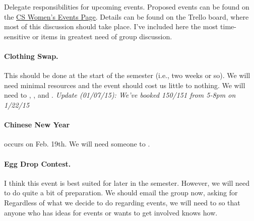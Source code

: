 \documentclass{agenda}
\begin{document}
\begin{agendaitem}{15}{Delegate responsibilities for upcoming events.}
    Proposed events can be found on the \href{http://umasscswomen.weebly.com/events.html}{\underline{CS Women's Events Page}}. Details can be found on the Trello board, where most of this discussion should take place. I've included here the most time-sensitive or items in greatest need of group discussion. 
    
    \paragraph{Clothing Swap.} This should be done at the start of the
    semester (i.e., two weeks or so). We will need minimal resources
    and the event should cost us little to nothing. We will need to
    , ,
    and . \emph{Update (01/07/15): We've booked 150/151 from
      5-8pm on 1/22/15}
    
    \paragraph{Chinese New Year} occurs on Feb. 19th. We will need
    someone to . 
     
    \paragraph{Egg Drop Contest.} I think this event is best suited
    for later in the semester. However, we will need to do quite a bit
    of preparation. We should email the group now, asking for
       Regardless of what we decide to do regarding events, we will
       need to  so that anyone who has ideas for events or wants
       to get involved knows how. 
\end{agendaitem}
\end{document}
